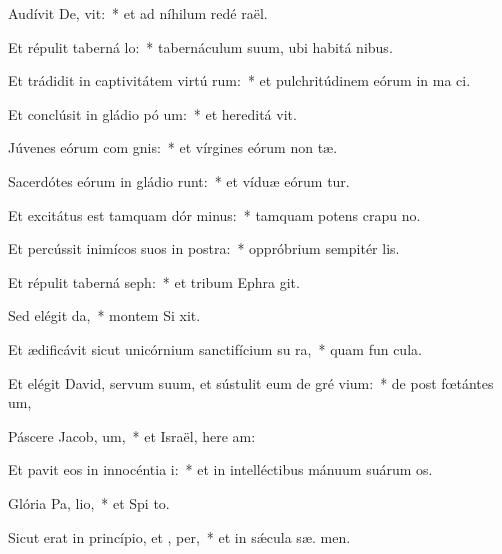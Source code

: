 \item Audívit De,  vit:~* et ad níhilum redé  raël.
\item Et répulit taberná lo:~* tabernáculum suum, ubi habitá  nibus.
\item Et trádidit in captivitátem virtú rum:~* et pulchritúdinem eórum in ma ci.
\item Et conclúsit in gládio pó um:~* et hereditá  vit.
\item Júvenes eórum com gnis:~* et vírgines eórum non  tæ.
\item Sacerdótes eórum in gládio runt:~* et víduæ eórum  tur.
\item Et excitátus est tamquam dór minus:~* tamquam potens crapu  no.
\item Et percússit inimícos suos in postra:~* oppróbrium sempitér  lis.
\item Et répulit taberná seph:~* et tribum Ephra  git.
\item Sed elégit  da,~* montem Si  xit.
\item Et ædificávit sicut unicórnium sanctifícium su  ra,~* quam fun  cula.
\item Et elégit David, servum suum, et sústulit eum de gré vium:~* de post fœtántes  um,
\item Páscere Jacob,  um,~* et Israël, here am:
\item Et pavit eos in innocéntia  i:~* et in intelléctibus mánuum suárum  os.
\item Glória Pa,  lio,~* et Spi to.
\item Sicut erat in princípio, et ,  per,~* et in sǽcula sæ. men.
